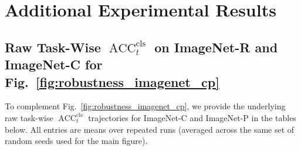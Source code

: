 \documentclass{article}
\theoremstyle{plain}
\theoremstyle{definition}
\theoremstyle{remark}
\begin{document}

\printAffiliationsAndNotice{}  %

\begin{abstract}
 
\end{abstract}



\section{Additional Experimental Results}


\subsection{Raw Task-Wise $\operatorname{ACC}^{\mathrm{cls}}_t$ on ImageNet-R and ImageNet-C for Fig.~\ref{fig:robustness_imagenet_cp}}

To complement Fig.~\ref{fig:robustness_imagenet_cp}, we provide the underlying raw task-wise $\operatorname{ACC}^{\mathrm{cls}}_t$ trajectories for ImageNet-C and ImageNet-P in the tables below.
All entries are {means over repeated runs} (averaged across the same set of random seeds used for the main figure).
\end{document}
